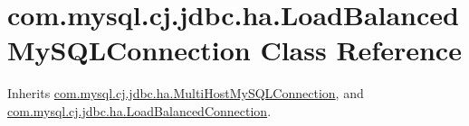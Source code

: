 \hypertarget{classcom_1_1mysql_1_1cj_1_1jdbc_1_1ha_1_1_load_balanced_my_s_q_l_connection}{}\section{com.\+mysql.\+cj.\+jdbc.\+ha.\+Load\+Balanced\+My\+S\+Q\+L\+Connection Class Reference}
\label{classcom_1_1mysql_1_1cj_1_1jdbc_1_1ha_1_1_load_balanced_my_s_q_l_connection}


Inherits \mbox{\hyperlink{classcom_1_1mysql_1_1cj_1_1jdbc_1_1ha_1_1_multi_host_my_s_q_l_connection}{com.\+mysql.\+cj.\+jdbc.\+ha.\+Multi\+Host\+My\+S\+Q\+L\+Connection}}, and \mbox{\hyperlink{interfacecom_1_1mysql_1_1cj_1_1jdbc_1_1ha_1_1_load_balanced_connection}{com.\+mysql.\+cj.\+jdbc.\+ha.\+Load\+Balanced\+Connection}}.

